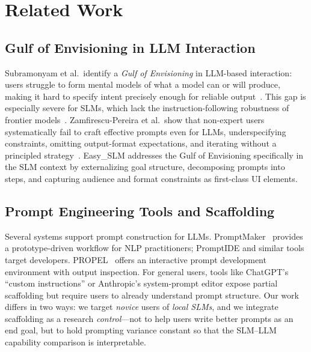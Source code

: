 \section{Related Work}

\subsection{Gulf of Envisioning in LLM Interaction}

Subramonyam et al.\ identify a \textit{Gulf of Envisioning} in LLM-based
interaction: users struggle to form mental models of what a model can or will
produce, making it hard to specify intent precisely enough for reliable
output~\cite{subramonyam2024gulf}.
This gap is especially severe for SLMs, which lack the instruction-following
robustness of frontier models~\cite{zamfirescu2023johnny}.
Zamfirescu-Pereira et al.\ show that non-expert users systematically fail to
craft effective prompts even for LLMs, underspecifying constraints, omitting
output-format expectations, and iterating without a principled
strategy~\cite{zamfirescu2023johnny}.
Easy\_SLM addresses the Gulf of Envisioning specifically in the SLM context by
externalizing goal structure, decomposing prompts into steps, and capturing
audience and format constraints as first-class UI elements.

\subsection{Prompt Engineering Tools and Scaffolding}

Several systems support prompt construction for LLMs.
PromptMaker~\cite{jiang2022promptmaker} provides a prototype-driven workflow
for NLP practitioners; PromptIDE and similar tools target developers.
PROPEL~\cite{strobelt2022interactive} offers an interactive prompt development
environment with output inspection.
For general users, tools like ChatGPT's ``custom instructions'' or
Anthropic's system-prompt editor expose partial scaffolding but require users
to already understand prompt structure.
Our work differs in two ways: we target \textit{novice} users of
\textit{local SLMs}, and we integrate scaffolding as a research
\textit{control}---not to help users write better prompts as an end goal,
but to hold prompting variance constant so that the SLM--LLM capability
comparison is interpretable.

